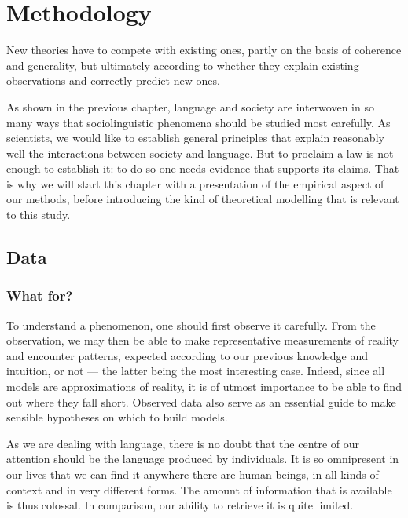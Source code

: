 \documentclass[../thesis.tex]{subfiles}
\begin{document}
\chapter{Methodology}
\label{ch:methods}

\epigraph{
  New theories have to compete with existing ones, partly on the basis of
  coherence and generality, but ultimately according to whether they explain existing
  observations and correctly predict new ones.
}{
}

As shown in the previous chapter, language and society are interwoven in so many ways
that sociolinguistic phenomena should be studied most carefully. As scientists, we would like to
establish general principles that explain reasonably well the interactions between society and
language. But to proclaim a law is not enough to establish it: to do so one needs
evidence that supports its claims. That is why we will start this chapter with a
presentation of the empirical aspect of our methods, before introducing the kind of
theoretical modelling that is relevant to this study.



\section{Data}
\subsection{What for?}
To understand a phenomenon, one should first observe it carefully. From the observation,
we may then be able to make representative measurements of reality and encounter
patterns, expected according to our previous knowledge and intuition, or not --- the
latter being the most interesting case. Indeed, since all models are approximations of
reality, it is of utmost importance to be able to find out where they fall short.
Observed data also serve as an essential guide to make sensible hypotheses on which to
build models.

As we are dealing with language, there is no doubt that the centre of our attention
should be the language produced by individuals. It is so omnipresent in our lives that
we can find it anywhere there are human beings, in all kinds of context and in very
different forms. The amount of information that is available is thus colossal. In
comparison, our ability to retrieve it is quite limited.
\end{document}
